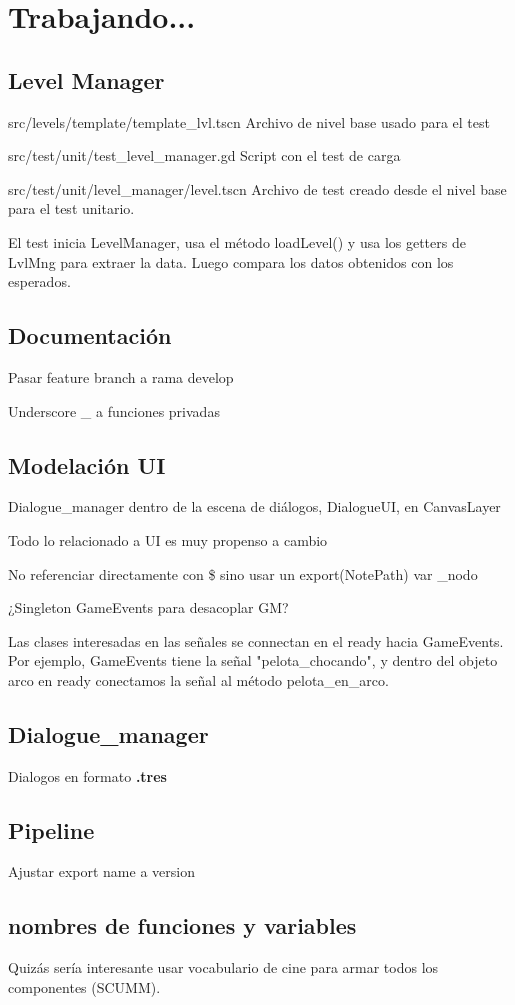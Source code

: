 
\section{Trabajando...}\label{Trabajando}

\subsection{Level Manager}

src/levels/template/template\_lvl.tscn Archivo de nivel base usado para el test

src/test/unit/test\_level\_manager.gd Script con el test de carga

src/test/unit/level\_manager/level.tscn Archivo de test creado desde el nivel base para el test unitario.

El test inicia LevelManager, usa el método loadLevel() y usa los getters de LvlMng para extraer la data. Luego compara los datos obtenidos con los esperados.


\subsection{Documentación}

Pasar feature branch a rama develop

Underscore \_ a funciones privadas

\subsection{Modelación UI}

Dialogue\_manager dentro de la escena de diálogos, DialogueUI, en CanvasLayer

Todo lo relacionado a UI es muy propenso a cambio

No referenciar directamente con \$ sino usar un export(NotePath) var \_nodo

¿Singleton GameEvents para desacoplar GM?

Las clases interesadas en las señales se connectan en el ready hacia GameEvents. Por ejemplo, GameEvents tiene la señal "pelota\_chocando", y dentro del objeto arco en ready conectamos la señal al método pelota\_en\_arco. 

\subsection{Dialogue\_manager}

Dialogos en formato \textbf{.tres}

\subsection{Pipeline}

Ajustar export name a version

\subsection{nombres de funciones y variables}

Quizás sería interesante usar vocabulario de cine para armar todos los componentes (SCUMM).
